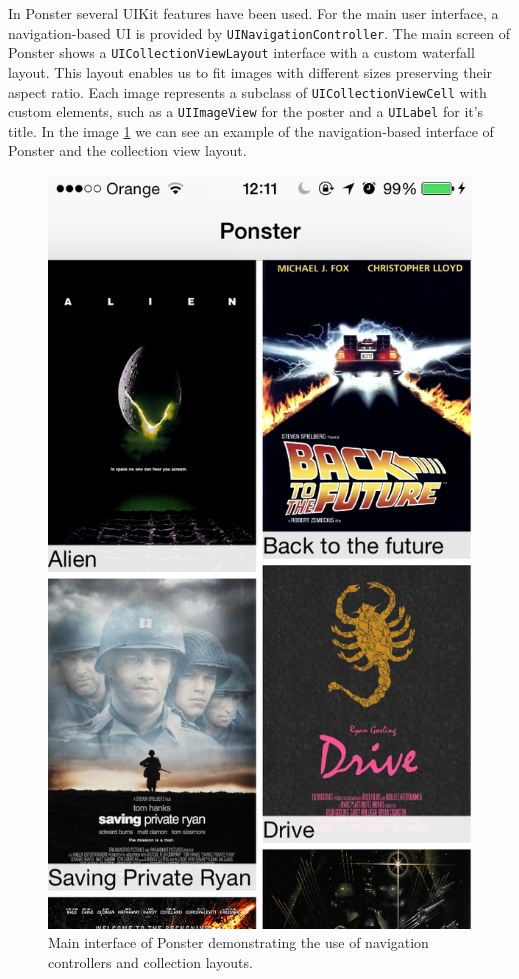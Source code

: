 In Ponster several UIKit features have been used. For the main user interface, a
navigation-based UI is provided by \texttt{UINavigationController}. The main screen
of Ponster shows a \texttt{UICollectionViewLayout} interface with a custom waterfall
layout. This layout enables us to fit images with different sizes preserving their
aspect ratio. Each image represents a subclass of \texttt{UICollectionViewCell} with
custom elements, such as a \texttt{UIImageView} for the poster and a \texttt{UILabel}
for it's title. In the image
\ref{fig:iosapp01} we can see an example of the navigation-based interface of
Ponster and the collection view layout.

\begin{figure}
\centering
\includegraphics[scale=0.35]{img/iosapp01.png}
\caption{\label{fig:iosapp01}Main interface of Ponster demonstrating the use of
  navigation controllers and collection layouts.}
\end{figure} 

